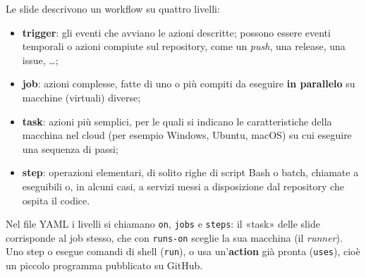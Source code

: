 Le slide descrivono un workflow su quattro livelli:

\begin{itemize}
  \item \textbf{trigger}: gli eventi che avviano le azioni descritte; possono essere eventi temporali o azioni compiute
        sul repository, come un \textit{push}, una release, una issue, \ldots;
  \item \textbf{job}: azioni complesse, fatte di uno o più compiti da eseguire \textbf{in parallelo} su macchine
        (virtuali) diverse;
  \item \textbf{task}: azioni più semplici, per le quali si indicano le caratteristiche della macchina nel cloud (per
        esempio Windows, Ubuntu, macOS) su cui eseguire una sequenza di passi;
  \item \textbf{step}: operazioni elementari, di solito righe di script Bash o batch, chiamate a eseguibili o, in alcuni
        casi, a servizi messi a disposizione dal repository che ospita il codice.
\end{itemize}

Nel file YAML i livelli si chiamano \texttt{on}, \texttt{jobs} e \texttt{steps}: il «task» delle slide corrisponde al
job stesso, che con \texttt{runs-on} sceglie la sua macchina (il \textit{runner}). Uno step o esegue comandi di shell
(\texttt{run}), o usa un'\textbf{action} già pronta (\texttt{uses}), cioè un piccolo programma pubblicato su GitHub.

\begin{center}
\end{center}

